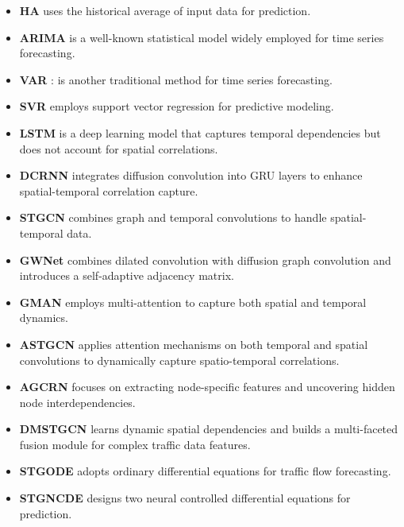 \begin{itemize}
    \item \textbf{HA} \cite{hamilton2020HA} uses the historical average 
    of input data for prediction.
    \item \textbf{ARIMA} \cite{box2015ARIMA} is a well-known statistical model widely employed for time series forecasting.
    \item \textbf{VAR} \cite{lutkepohl2005VAR}: is another traditional method for time series forecasting.
    \item \textbf{SVR} \cite{wu2004SVR} employs support vector regression for predictive modeling.
    \item \textbf{LSTM} \cite{graves2012LSTM} is a deep learning model that captures temporal dependencies but does not account for spatial correlations.
    \item \textbf{DCRNN} \cite{li2018DCRNN} integrates diffusion convolution into GRU layers to enhance spatial-temporal correlation capture.
    \item \textbf{STGCN} \cite{yu2017STGCN} combines graph and temporal convolutions to handle spatial-temporal data.
    \item \textbf{GWNet} \cite{wu2019GWNet} combines dilated convolution with diffusion graph convolution and introduces a self-adaptive adjacency matrix.
    \item \textbf{GMAN} \cite{zheng2020GMANaaai} employs multi-attention to capture both spatial and temporal dynamics.
    \item \textbf{ASTGCN} \cite{guo2019ASTGCN} applies attention mechanisms on both temporal and spatial convolutions to dynamically capture spatio-temporal correlations.
    \item \textbf{AGCRN} \cite{bai2020AGCRN} focuses on extracting node-specific features and uncovering hidden node interdependencies.
    \item \textbf{DMSTGCN} \cite{han2021DMSTGCN}  learns dynamic spatial dependencies and builds a multi-faceted fusion module for complex traffic data features.
    \item \textbf{STGODE} \cite{fang2021STGODE} adopts ordinary differential equations for traffic flow forecasting.
    \item \textbf{STGNCDE} \cite{choi2022STGNCDE} designs two neural controlled differential equations for prediction.

\end{itemize}
